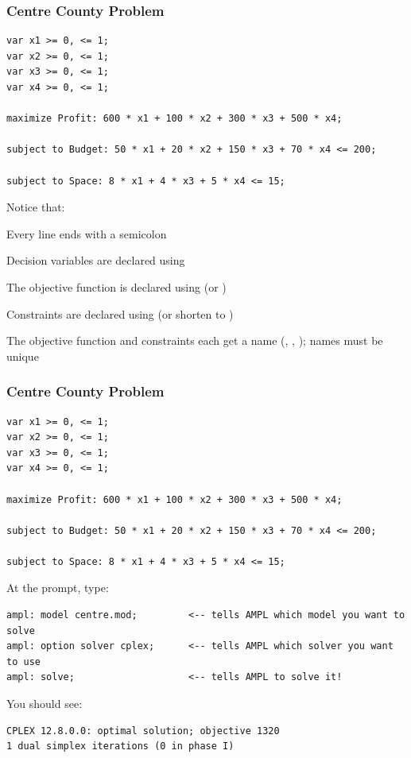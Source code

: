 \begin{frame}[fragile]

	\frametitle{Centre County Problem}
		
\begin{lstlisting}
var x1 >= 0, <= 1;
var x2 >= 0, <= 1;
var x3 >= 0, <= 1;
var x4 >= 0, <= 1;

maximize Profit: 600 * x1 + 100 * x2 + 300 * x3 + 500 * x4;

subject to Budget: 50 * x1 + 20 * x2 + 150 * x3 + 70 * x4 <= 200;

subject to Space: 8 * x1 + 4 * x3 + 5 * x4 <= 15;
\end{lstlisting}

	\bit
	\item Notice that:
		\bit
		\item Every line ends with a semicolon
		\item Decision variables are declared using 
		\item The objective function is declared using  (or )
		\item Constraints are declared using  (or shorten to )
		\item The objective function and constraints each get a name (, , ); names must be unique
		\eit
	\eit
	
\end{frame}

\begin{frame}[fragile]

	\frametitle{Centre County Problem} 

\begin{lstlisting}
var x1 >= 0, <= 1;
var x2 >= 0, <= 1;
var x3 >= 0, <= 1;
var x4 >= 0, <= 1;

maximize Profit: 600 * x1 + 100 * x2 + 300 * x3 + 500 * x4;

subject to Budget: 50 * x1 + 20 * x2 + 150 * x3 + 70 * x4 <= 200;

subject to Space: 8 * x1 + 4 * x3 + 5 * x4 <= 15;
\end{lstlisting}

	\bit
	\item At the  prompt, type:
	\eit
	
\begin{lstlisting}
ampl: model centre.mod;			<-- tells AMPL which model you want to solve
ampl: option solver cplex;		<-- tells AMPL which solver you want to use
ampl: solve;					<-- tells AMPL to solve it!
\end{lstlisting}

	\bit
	\item You should see:
	\eit
	
\begin{lstlisting}
CPLEX 12.8.0.0: optimal solution; objective 1320
1 dual simplex iterations (0 in phase I)
\end{lstlisting}

\end{frame}

